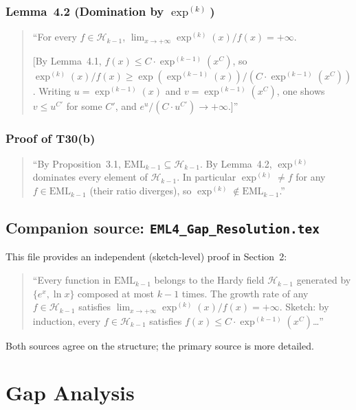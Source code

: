 \documentclass[12pt,a4paper]{article}
\theoremstyle{definition}
\theoremstyle{remark}
\begin{document}
\subsubsection*{Lemma~4.2 (Domination by $\exp^{(k)}$)}
\begin{quote}
``For every $f\in\mathcal{H}_{k-1}$,
$\lim_{x\to+\infty}\exp^{(k)}(x)/f(x)=+\infty$.

[By Lemma~4.1, $f(x)\leq C\cdot\exp^{(k-1)}(x^C)$, so
$\exp^{(k)}(x)/f(x)\geq\exp(\exp^{(k-1)}(x))/(C\cdot\exp^{(k-1)}(x^C))$.
Writing $u=\exp^{(k-1)}(x)$ and $v=\exp^{(k-1)}(x^C)$, one shows
$v\leq u^{C'}$ for some $C'$, and $e^u/(C\cdot u^{C'})\to+\infty$.]''
\end{quote}

\subsubsection*{Proof of T30(b)}
\begin{quote}
``By Proposition~3.1, $\mathrm{EML}_{k-1}\subseteq\mathcal{H}_{k-1}$.
By Lemma~4.2, $\exp^{(k)}$ dominates every element of $\mathcal{H}_{k-1}$.
In particular $\exp^{(k)}\neq f$ for any $f\in\mathrm{EML}_{k-1}$ (their
ratio diverges), so $\exp^{(k)}\notin\mathrm{EML}_{k-1}$.''
\end{quote}

\subsection{Companion source: \texttt{EML4\_Gap\_Resolution.tex}}

This file provides an independent (sketch-level) proof in Section~2:

\begin{quote}
``Every function in $\mathrm{EML}_{k-1}$ belongs to the Hardy field
$\mathcal{H}_{k-1}$ generated by $\{e^x,\ln x\}$ composed at most $k-1$
times.  The growth rate of any $f\in\mathcal{H}_{k-1}$ satisfies
$\lim_{x\to+\infty}\exp^{(k)}(x)/f(x)=+\infty$.
Sketch: by induction, every $f\in\mathcal{H}_{k-1}$ satisfies
$f(x)\leq C\cdot\exp^{(k-1)}(x^C)$\ldots''
\end{quote}

Both sources agree on the structure; the primary source is more detailed.

\section{Gap Analysis}
\end{document}
